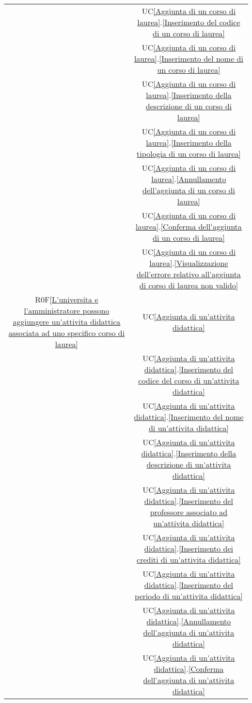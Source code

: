 \begin{longtable}{|c|c|}
& UC\ref{Aggiunta di un corso di laurea}.\ref{Inserimento del codice di un corso di laurea}\\
& UC\ref{Aggiunta di un corso di laurea}.\ref{Inserimento del nome di un corso di laurea}\\
& UC\ref{Aggiunta di un corso di laurea}.\ref{Inserimento della descrizione di un corso di laurea}\\
& UC\ref{Aggiunta di un corso di laurea}.\ref{Inserimento della tipologia di un corso di laurea}\\
& UC\ref{Aggiunta di un corso di laurea}.\ref{Annullamento dell'aggiunta di un corso di laurea}\\
& UC\ref{Aggiunta di un corso di laurea}.\ref{Conferma dell'aggiunta di un corso di laurea}\\
& UC\ref{Aggiunta di un corso di laurea}.\ref{Visualizzazione dell'errore relativo all'aggiunta di corso di laurea non valido}\\
\hline
R0F\ref{L'universita e l'amministratore possono aggiungere un'attivita didattica associata ad uno specifico corso di laurea} & UC\ref{Aggiunta di un'attivita didattica}\\
& UC\ref{Aggiunta di un'attivita didattica}.\ref{Inserimento del codice del corso di un'attivita didattica}\\
& UC\ref{Aggiunta di un'attivita didattica}.\ref{Inserimento del nome di un'attivita didattica}\\
& UC\ref{Aggiunta di un'attivita didattica}.\ref{Inserimento della descrizione di un'attivita didattica}\\
& UC\ref{Aggiunta di un'attivita didattica}.\ref{Inserimento del professore associato ad un'attivita didattica}\\
& UC\ref{Aggiunta di un'attivita didattica}.\ref{Inserimento dei crediti di un'attivita didattica}\\
& UC\ref{Aggiunta di un'attivita didattica}.\ref{Inserimento del periodo di un'attivita didattica}\\
& UC\ref{Aggiunta di un'attivita didattica}.\ref{Annullamento dell'aggiunta di un'attivita didattica}\\
& UC\ref{Aggiunta di un'attivita didattica}.\ref{Conferma dell'aggiunta di un'attivita didattica}\\

\end{longtable}
